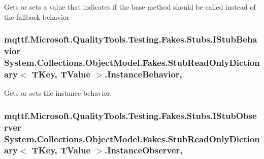 Gets or sets a value that indicates if the base method should be called instead of the fallback behavior

\hypertarget{class_system_1_1_collections_1_1_object_model_1_1_fakes_1_1_stub_read_only_dictionary_3_01_t_key_00_01_t_value_01_4_a42a772ce9a3033539108ca85de52dd62}{
\subsubsection[{Instance\-Behavior}]{\setlength{\rightskip}{0pt plus 5cm}mqttf.\-Microsoft.\-Quality\-Tools.\-Testing.\-Fakes.\-Stubs.\-I\-Stub\-Behavior System.\-Collections.\-Object\-Model.\-Fakes.\-Stub\-Read\-Only\-Dictionary$<$ T\-Key, T\-Value $>$.Instance\-Behavior\hspace{0.3cm}{\ttfamily [get]}, {\ttfamily [set]}}}\label{class_system_1_1_collections_1_1_object_model_1_1_fakes_1_1_stub_read_only_dictionary_3_01_t_key_00_01_t_value_01_4_a42a772ce9a3033539108ca85de52dd62}


Gets or sets the instance behavior.

\hypertarget{class_system_1_1_collections_1_1_object_model_1_1_fakes_1_1_stub_read_only_dictionary_3_01_t_key_00_01_t_value_01_4_a2a37502b848e988362aa625b28e70801}{
\subsubsection[{Instance\-Observer}]{\setlength{\rightskip}{0pt plus 5cm}mqttf.\-Microsoft.\-Quality\-Tools.\-Testing.\-Fakes.\-Stubs.\-I\-Stub\-Observer System.\-Collections.\-Object\-Model.\-Fakes.\-Stub\-Read\-Only\-Dictionary$<$ T\-Key, T\-Value $>$.Instance\-Observer\hspace{0.3cm}{\ttfamily [get]}, {\ttfamily [set]}}}\label{class_system_1_1_collections_1_1_object_model_1_1_fakes_1_1_stub_read_only_dictionary_3_01_t_key_00_01_t_value_01_4_a2a37502b848e988362aa625b28e70801}


